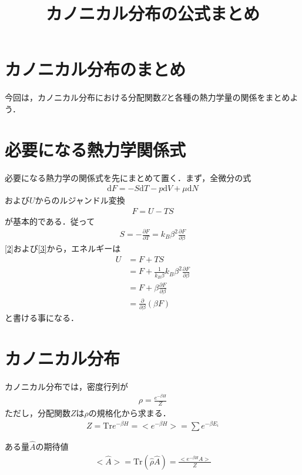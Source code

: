 \documentclass[a4j]{jarticle}
\title{カノニカル分布の公式まとめ}
\begin{document}
\maketitle

\section{カノニカル分布のまとめ}
今回は，カノニカル分布における分配関数$Z$と各種の熱力学量の関係をまとめよう．


\section{必要になる熱力学関係式}
必要になる熱力学の関係式を先にまとめて置く．まず，全微分の式
\begin{align}
 \mathrm{d}F=-S\mathrm{d}T-p\mathrm{d}V+\mu \mathrm{d}N\label{1}
\end{align}
および$U$からのルジャンドル変換
\begin{align}
 F=U-TS\label{2}
\end{align}
が基本的である．従って
\begin{align}
 S=-\frac{\partial F}{\partial T}=k_B\beta^2\frac{\partial F}{\partial \beta }\label{3}
\end{align}
\ref{2}および\ref{3}から，エネルギーは
\begin{align*}
 U&=F+TS \\
&=F+\frac{1}{k_B\beta }k_B\beta^2\frac{\partial F}{\partial \beta } \\
&=F+\beta\frac{\partial F}{\partial \beta } \\
&=\frac{\partial}{\partial \beta }\left(\beta F\right)
\end{align*}
と書ける事になる．


\section{カノニカル分布}
カノニカル分布では，密度行列が
\begin{align*}
 \rho =\frac{e^{-\beta H}}{Z}
\end{align*}
ただし，分配関数$Z$は$\rho$の規格化から求まる．
\begin{align*}
 Z=\mathrm{Tr}e^{-\beta H}=<e^{-\beta H}>=\sum e^{-\beta E_i}
\end{align*}

ある量$\hat{A}$の期待値
\begin{align*}
 <\hat{A}>=\mathrm{Tr}(\hat{\rho}\hat{A})=\frac{<e^{-\beta H}A>}{Z}
\end{align*}
\end{document}
